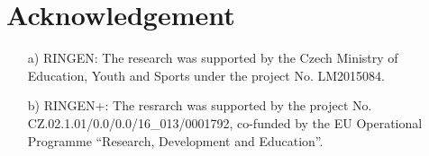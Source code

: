 \documentclass{article}
\begin{document}
\section*{Acknowledgement}
\begin{itemize}
    \item[a)] RINGEN:
    The research was supported by the Czech Ministry of Education, Youth and Sports under the project No. LM2015084.
 
    \item[b)] RINGEN+:
    The resrarch was supported by the project No. CZ.02.1.01/0.0/0.0/16\_013/0001792, co-funded by the EU Operational Programme ``Research, Development and Education''.
\end{itemize}












\end{document}
